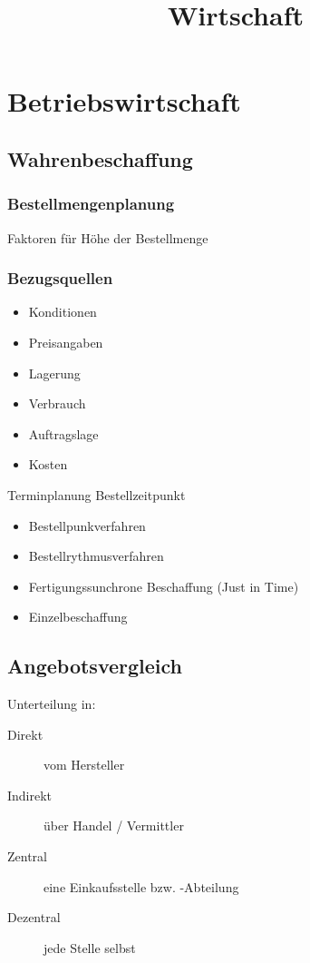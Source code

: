 \documentclass{scrartcl}
\title{Wirtschaft}
\begin{document}
\maketitle

\tableofcontents

\section{Betriebswirtschaft}
\subsection{Wahrenbeschaffung}
\subsubsection{Bestellmengenplanung}

Faktoren für Höhe der Bestellmenge

\subsubsection{Bezugsquellen}

\begin{itemize}
	\item
		Konditionen
	\item
		Preisangaben
	\item
		Lagerung
	\item
		Verbrauch
	\item
		Auftragslage
	\item
		Kosten
\end{itemize}

Terminplanung Bestellzeitpunkt

\begin{itemize}
	\item
		Bestellpunkverfahren
	\item
		Bestellrythmusverfahren
	\item
		Fertigungssunchrone Beschaffung (Just in Time)
	\item
		Einzelbeschaffung
\end{itemize}

\subsection{Angebotsvergleich}

Unterteilung in:
\begin{description}
	\item [Direkt] vom Hersteller
	\item [Indirekt] über Handel / Vermittler
	\item [Zentral] eine Einkaufsstelle bzw. -Abteilung
	\item [Dezentral] jede Stelle selbst
\end{description}
\end{document}

